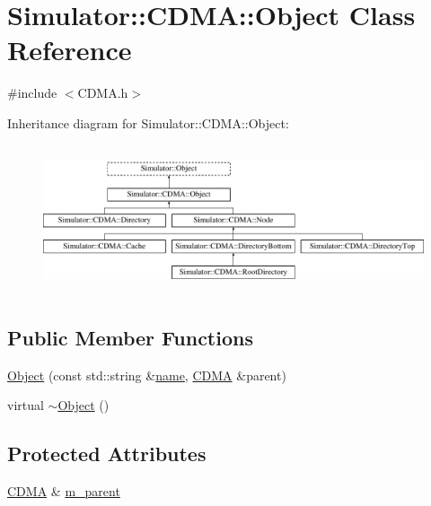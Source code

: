 \hypertarget{class_simulator_1_1_c_d_m_a_1_1_object}{\section{Simulator\+:\+:C\+D\+M\+A\+:\+:Object Class Reference}
\label{class_simulator_1_1_c_d_m_a_1_1_object}
}


{\ttfamily \#include $<$C\+D\+M\+A.\+h$>$}

Inheritance diagram for Simulator\+:\+:C\+D\+M\+A\+:\+:Object\+:\begin{figure}[H]
\begin{center}
\leavevmode
\includegraphics[height=4.402516cm]{class_simulator_1_1_c_d_m_a_1_1_object}
\end{center}
\end{figure}
\subsection*{Public Member Functions}
\begin{DoxyCompactItemize}
\item 
\hyperlink{class_simulator_1_1_c_d_m_a_1_1_object_a4937182d07fca9e6ad83c4ce7b0266e6}{Object} (const std\+::string \&\hyperlink{mtconf_8c_a8f8f80d37794cde9472343e4487ba3eb}{name}, \hyperlink{class_simulator_1_1_c_d_m_a}{C\+D\+M\+A} \&parent)
\item 
virtual \hyperlink{class_simulator_1_1_c_d_m_a_1_1_object_ab3685e985fc8b6876233e97fdab17243}{$\sim$\+Object} ()
\end{DoxyCompactItemize}
\subsection*{Protected Attributes}
\begin{DoxyCompactItemize}
\item 
\hyperlink{class_simulator_1_1_c_d_m_a}{C\+D\+M\+A} \& \hyperlink{class_simulator_1_1_c_d_m_a_1_1_object_aca8d30e62f66ebdebbe0291d60499368}{m\+\_\+parent}
\end{DoxyCompactItemize}


